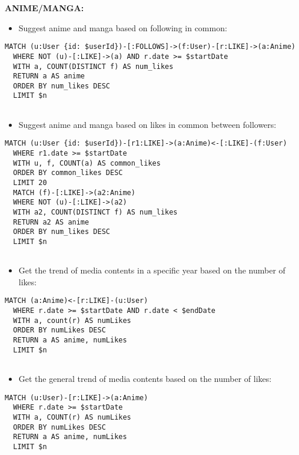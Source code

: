 \textbf{ANIME/MANGA:}

\begin{itemize}
  \item Suggest anime and manga based on following in common:
\end{itemize}
\begin{lstlisting}[language=Cypher, caption=GetSuggestedByFollowings]
  MATCH (u:User {id: $userId})-[:FOLLOWS]->(f:User)-[r:LIKE]->(a:Anime)
  WHERE NOT (u)-[:LIKE]->(a) AND r.date >= $startDate
  WITH a, COUNT(DISTINCT f) AS num_likes
  RETURN a AS anime
  ORDER BY num_likes DESC
  LIMIT $n
  
\end{lstlisting}


\begin{itemize}
  \item Suggest anime and manga based on likes in common between followers:
\end{itemize}
\begin{lstlisting}[language=Cypher, caption=GetSuggestedByLikes]
  MATCH (u:User {id: $userId})-[r1:LIKE]->(a:Anime)<-[:LIKE]-(f:User)
  WHERE r1.date >= $startDate
  WITH u, f, COUNT(a) AS common_likes
  ORDER BY common_likes DESC
  LIMIT 20
  MATCH (f)-[:LIKE]->(a2:Anime)
  WHERE NOT (u)-[:LIKE]->(a2)
  WITH a2, COUNT(DISTINCT f) AS num_likes
  RETURN a2 AS anime
  ORDER BY num_likes DESC
  LIMIT $n
  
\end{lstlisting}


\begin{itemize}
  \item Get the trend of media contents in a specific year based on the number of likes:
\end{itemize}
\begin{lstlisting}[language=Cypher, caption=GetTrendMediaContentByYear]
  MATCH (a:Anime)<-[r:LIKE]-(u:User)
  WHERE r.date >= $startDate AND r.date < $endDate
  WITH a, count(r) AS numLikes
  ORDER BY numLikes DESC
  RETURN a AS anime, numLikes
  LIMIT $n
  
\end{lstlisting}

\begin{itemize}
  \item Get the general trend of media contents based on the number of likes:
\end{itemize}
\begin{lstlisting}[language=Cypher, caption=GetMediaContentTrendByLikes]
  MATCH (u:User)-[r:LIKE]->(a:Anime)
  WHERE r.date >= $startDate
  WITH a, COUNT(r) AS numLikes
  ORDER BY numLikes DESC
  RETURN a AS anime, numLikes
  LIMIT $n
  
\end{lstlisting}
